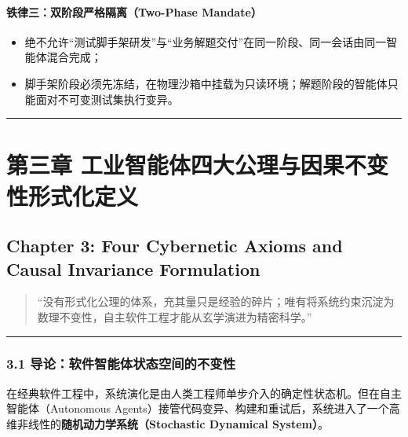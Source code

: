 \paragraph{铁律三：双阶段严格隔离（Two-Phase
Mandate）}\label{ux94c1ux5f8bux4e09ux53ccux9636ux6bb5ux4e25ux683cux9694ux79bbtwo-phase-mandate}

\begin{itemize}
\tightlist
\item
  绝不允许``测试脚手架研发''与``业务解题交付''在同一阶段、同一会话由同一智能体混合完成；
\item
  脚手架阶段必须先冻结，在物理沙箱中挂载为只读环境；解题阶段的智能体只能面对不可变测试集执行变异。
\end{itemize}

\begin{center}\rule{0.5\linewidth}{0.5pt}\end{center}

\section{第三章
工业智能体四大公理与因果不变性形式化定义}\label{ux7b2cux4e09ux7ae0-ux5de5ux4e1aux667aux80fdux4f53ux56dbux5927ux516cux7406ux4e0eux56e0ux679cux4e0dux53d8ux6027ux5f62ux5f0fux5316ux5b9aux4e49}

\subsection{Chapter 3: Four Cybernetic Axioms and Causal Invariance
Formulation}\label{chapter-3-four-cybernetic-axioms-and-causal-invariance-formulation}

\begin{quote}
``没有形式化公理的体系，充其量只是经验的碎片；唯有将系统约束沉淀为数理不变性，自主软件工程才能从玄学演进为精密科学。''
\end{quote}

\begin{center}\rule{0.5\linewidth}{0.5pt}\end{center}

\subsubsection{3.1
导论：软件智能体状态空间的不变性}\label{ux5bfcux8bbaux8f6fux4ef6ux667aux80fdux4f53ux72b6ux6001ux7a7aux95f4ux7684ux4e0dux53d8ux6027}

在经典软件工程中，系统演化是由人类工程师单步介入的确定性状态机。但在自主智能体（Autonomous
Agents）接管代码变异、构建和重试后，系统进入了一个高维非线性的\textbf{随机动力学系统（Stochastic
Dynamical System）}。

